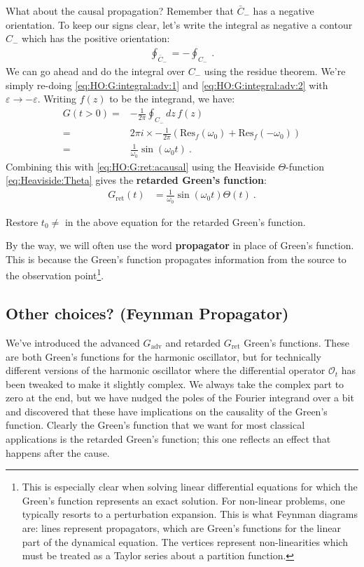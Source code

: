 What about the causal propagation? Remember that $\bar C_{-}$ has a negative orientation. To keep our signs clear, let's write the integral as negative a contour $C_-$  which has the positive orientation: 
\begin{align}
	\oint_{\bar C_-} = -\oint_{C_-} \ .
\end{align}
We can go ahead and do the integral over $C_-$ using the residue theorem. We're simply re-doing \eqref{eq:HO:G:integral:adv:1} and \eqref{eq:HO:G:integral:adv:2} with $\varepsilon\to -\varepsilon$. Writing $f(z)$ to be the integrand, we have:
\begin{align}
	G(t>0) =& 
	-\frac{1}{2\pi} \oint_{C_-}dz\, f(z)
	\\
	=&
	2\pi i \times -\frac{1}{2\pi} 
	\left(\text{Res}_f(\omega_0) + \text{Res}_f(-\omega_0)\right)
	\\
	=& \frac{1}{\omega_0}\sin(\omega_0 t) \ .
\end{align}
Combining this with \eqref{eq:HO:G:ret:acausal} using the Heaviside $\Theta$-function \eqref{eq:Heaviside:Theta} gives the \textbf{retarded Green's function}:
\begin{align}
	G_\text{ret}(t) &= 
	\frac{1}{\omega_0}
	\sin(\omega_0 t)
	\Theta(t) \ .
\end{align}
\begin{exercise}
Restore $t_0\neq$ in the above equation for the retarded Green's function.
\end{exercise}
By the way, we will often use the word \textbf{propagator} in place of Green's function. This is because the Green's function propagates information from the source to the observation point\footnote{This is especially clear when solving linear differential equations for which the Green's function represents an exact solution. For non-linear problems, one typically resorts to a perturbation expansion. This is what Feynman diagrams are: lines represent propagators, which are Green's functions for the linear part of the dynamical equation. The vertices represent non-linearities which must be treated as a Taylor series about a partition function.}. 


\subsection{Other choices? (Feynman Propagator)}

We've introduced the advanced $G_\text{adv}$ and retarded $G_\text{ret}$ Green's functions. These are both Green's functions for the harmonic oscillator, but for technically different versions of the harmonic oscillator where the differential operator $\mathcal O_t$ has been tweaked to make it slightly complex. We always take the complex part to zero at the end, but we have nudged the poles of the Fourier integrand over a bit and discovered that these have implications on the causality of the Green's function. Clearly the Green's function that we want for most classical applications is the retarded Green's function; this one reflects an effect that happens after the cause.

